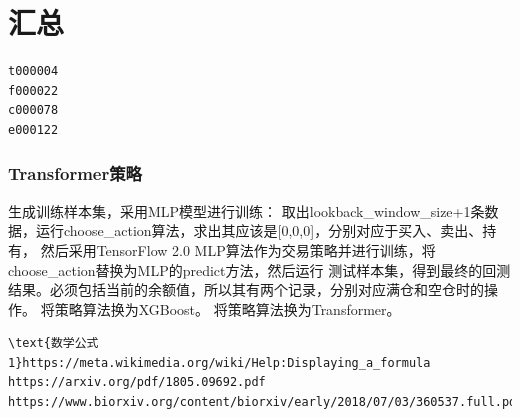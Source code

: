 \documentclass{article}
\begin{document}
\section{汇总}
\begin{lstlisting}
t000004
f000022
c000078
e000122
\end{lstlisting}




\subsubsection{Transformer策略}
生成训练样本集，采用MLP模型进行训练：\newline
取出lookback\_window\_size+1条数据，运行choose\_action算法，求出其应该是[0,0,0]，分别对应于买入、卖出、持有，
然后采用TensorFlow 2.0 MLP算法作为交易策略并进行训练，将choose\_action替换为MLP的predict方法，然后运行
测试样本集，得到最终的回测结果。必须包括当前的余额值，所以其有两个记录，分别对应满仓和空仓时的操作。\newline
将策略算法换为XGBoost。\newline
将策略算法换为Transformer。\newline













\begin{lstlisting}
\text{数学公式1}https://meta.wikimedia.org/wiki/Help:Displaying_a_formula
https://arxiv.org/pdf/1805.09692.pdf
https://www.biorxiv.org/content/biorxiv/early/2018/07/03/360537.full.pdf
\end{lstlisting}





\newpage




\appendix
\end{document}
